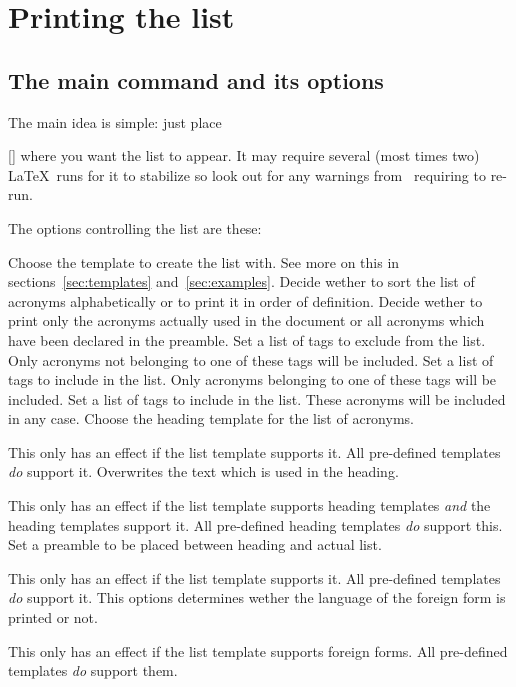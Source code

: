 \documentclass{acro-manual}
\begin{document}
\section{Printing the list}\label{sec:printing-list}
\subsection{The main command and its options}\label{sec:main-list}
The main idea is simple: just place
\begin{commands}
  []
    where you want the list to appear.  It may require several (most times
    two) \LaTeX\ runs for it to stabilize so look out for any warnings
    from \acro\ requiring to re-run.
\end{commands}
The options controlling the list are these:
\begin{options}
    Choose the template to create the list with.  See more on this in
    sections~\vref{sec:templates} and~\vref{sec:examples}.
    Decide wether to sort the list of acronyms alphabetically or to print it
    in order of definition.
    Decide wether to print only the acronyms actually used in the document or
    all acronyms which have been declared in the preamble.
  \Default
    Set a list of tags to exclude from the list.  Only acronyms not
    belonging to one of these tags will be included.
  \Default
    Set a list of tags to include in the list.  Only acronyms belonging to
    one of these tags will be included.
  \Default
    Set a list of tags to include in the list.  These
    acronyms will be included in any case.
    Choose the heading template for the list of acronyms.

    This only has an effect if the list template supports it.  All pre-defined
    templates \emph{do} support it.
    Overwrites the text which is used in the heading.

    This only has an effect if the list template supports heading templates
    \emph{and} the heading templates support it.  All pre-defined heading
    templates \emph{do} support this.
  \Default
    Set a preamble to be placed between heading and actual list.

    This only has an effect if the list template supports it.  All pre-defined
    templates \emph{do} support it.
    This options determines wether the language of the foreign form is printed
    or not.

    This only has an effect if the list template supports foreign forms.  All
    pre-defined templates \emph{do} support them.
\end{options}
\end{document}
